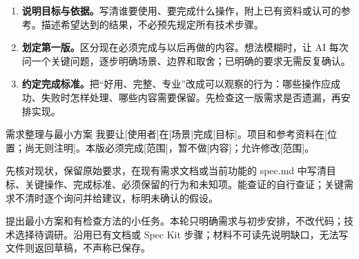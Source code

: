 \begin{enumerate}
\item \textbf{说明目标与依据。}写清谁要使用、要完成什么操作，附上已有资料或认可的参考。描述希望达到的结果，不必预先规定所有技术步骤。
\item \textbf{划定第一版。}区分现在必须完成与以后再做的内容。想法模糊时，让 AI 每次问一个关键问题，逐步明确场景、边界和取舍；已明确的要求无需反复确认。
\item \textbf{约定完成标准。}把“好用、完整、专业”改成可以观察的行为：哪些操作应成功、失败时怎样处理、哪些内容需要保留。先检查这一版需求是否遗漏，再安排实现。
\end{enumerate}
\begin{prompt}{需求整理与最小方案}
我要让[使用者]在[场景]完成[目标]。项目和参考资料在[位置；尚无则注明]。本版必须完成[范围]，暂不做[内容]；允许修改[范围]。\par
先核对现状，保留原始要求，在现有需求文档或当前功能的 spec.md 中写清目标、关键操作、完成标准、必须保留的行为和未知项。能查证的自行查证；关键需求不清时逐个询问并给建议，标明未确认的假设。\par
提出最小方案和有检查方法的小任务。本轮只明确需求与初步安排，不改代码；技术选择待调研。沿用已有文档或 Spec Kit 步骤；材料不可读先说明缺口，无法写文件则返回草稿，不声称已保存。
\end{prompt}

